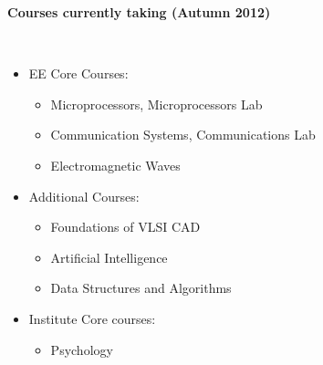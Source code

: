 \documentclass[a4paper,11pt]{article}
\newcommand{\isep}{-2 pt}
\newcommand{\lsep}{-0.5cm}
\newcommand{\resheading}[1]{{\small \colorbox{mygrey}{\begin{minipage}{0.975\textwidth}{\textbf{#1 \vphantom{p\^{E}}}}\end{minipage}}}}
\begin{document}
\resheading{\textbf{\large Courses currently taking (Autumn 2012)}}\\[\lsep]
\begin{itemize} \itemsep \isep
 	    \item EE Core Courses: \\[-0.6cm]
 	    \begin{itemize}\itemsep \isep
 	        \item Microprocessors, Microprocessors Lab
 	        \item Communication Systems, Communications Lab
 	        \item Electromagnetic Waves
 	    \end{itemize}
 	    \item Additional Courses: \\[-0.6cm]
 	    \begin{itemize}\itemsep \isep
 	        \item Foundations of VLSI CAD
 	        \item Artificial Intelligence
 	        \item Data Structures and Algorithms
 	    \end{itemize}
 	    \item Institute Core courses: \\[-0.6cm]
 	    \begin{itemize}\itemsep \isep
 	        \item Psychology
 	    \end{itemize}
 	\end{itemize}
\end{document}
